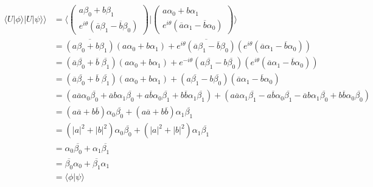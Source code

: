 \documentclass{article}
\begin{document}
\begin{align*}
    \langle U |\phi\rangle | U |\psi\rangle \rangle
    &= \langle \begin{pmatrix}
   a\beta_0 + b\beta_1\\
   e^{i\theta}(
   \overline{a} \beta_1 - \overline{b} \beta_0)
\end{pmatrix} | \begin{pmatrix}
   a\alpha_0 + b\alpha_1\\
   e^{i\theta}(
   \overline{a} \alpha_1 - \overline{b} \alpha_0)
\end{pmatrix} \rangle\\
&= \overline{(a\beta_0 + b\beta_1)}(a\alpha_0 + b\alpha_1) + 
\overline{e^{i\theta}(
   \overline{a} \beta_1 - \overline{b} \beta_0)}(e^{i\theta}(
   \overline{a} \alpha_1 - \overline{b} \alpha_0))\\
&= (\overline{a}\overline{\beta_0} + \overline{b}\;\overline{\beta_1})(a\alpha_0 + b\alpha_1) + 
e^{-i\theta}(
   a \overline{\beta_1} - b \overline{\beta_0})(e^{i\theta}(
   \overline{a} \alpha_1 - \overline{b} \alpha_0))\\
&= (\overline{a}\overline{\beta_0} + \overline{b}\;\overline{\beta_1})(a\alpha_0 + b\alpha_1) + 
(
   a \overline{\beta_1} - b \overline{\beta_0})(
   \overline{a} \alpha_1 - \overline{b} \alpha_0)\\
&= (a\overline{a}\alpha_0\overline{\beta_0} + 
\overline{a}b\alpha_1\overline{\beta_0} +
a \overline{b}\alpha_0\overline{\beta_1} +
b \overline{b} \alpha_1 \overline{\beta_1}) +
(a \overline{a} \alpha_1 \overline{\beta_1} -
a \overline{b} \alpha_0 \overline{\beta_1} -
\overline{a} b \alpha_1 \overline{\beta_0} +
b \overline{b} \alpha_0 \overline{\beta_0})\\
&= (a\overline{a}+b\overline{b})\alpha_0\overline{\beta_0} +
(a \overline{a} + b \overline{b}) \alpha_1 \overline{\beta_1}\\
&= (|a|^2 + |b|^2)\alpha_0\overline{\beta_0} +
(|a|^2 + |b|^2) \alpha_1 \overline{\beta_1}\\
&= \alpha_0\overline{\beta_0} +
   \alpha_1 \overline{\beta_1}\\
&= \overline{\beta_0} \alpha_0 +
   \overline{\beta_1} \alpha_1 \\
&= \langle \phi | \psi \rangle
\end{align*}


% 


\end{document}
